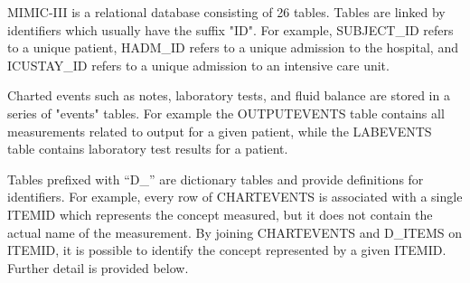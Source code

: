 \documentclass[english]{article}
\begin{document}



MIMIC-III is a relational database consisting of 26 tables. Tables are linked by identifiers which usually have the suffix "ID". For example, SUBJECT\_ID refers to a unique patient, HADM\_ID refers to a unique admission to the hospital, and ICUSTAY\_ID refers to a unique admission to an intensive care unit.

Charted events such as notes, laboratory tests, and fluid balance are stored in a series of "events" tables. For example the OUTPUTEVENTS table contains all measurements related to output for a given patient, while the LABEVENTS table contains laboratory test results for a patient.

Tables prefixed with “D\_” are dictionary tables and provide definitions for identifiers. For example, every row of CHARTEVENTS is associated with a single ITEMID which represents the concept measured, but it does not contain the actual name of the measurement. By joining CHARTEVENTS and D\_ITEMS on ITEMID, it is possible to identify the concept represented by a given ITEMID. Further detail is provided below.
\end{document}
